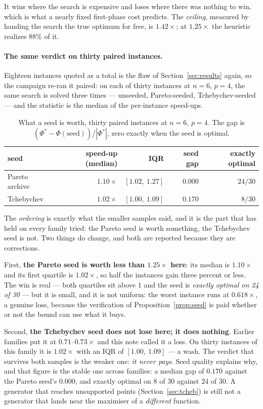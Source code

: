 \documentclass[11pt,a4paper]{article}
\begin{document}
It wins where the search is expensive and loses where there was nothing to win,
which is what a nearly fixed first-phase cost predicts. The \emph{ceiling},
measured by handing the search the true optimum for free, is $1.42\times$; at
$1.25\times$ the heuristic realizes 88\% of it.

\paragraph{The same verdict on thirty paired instances.}  Eighteen instances
quoted as a total is the flaw of Section~\ref{sec:results} again, so the
campaign re-ran it paired: on each of thirty instances at $n=6$, $p=4$, the
same search is solved three times --- unseeded, Pareto-seeded,
Tchebychev-seeded --- and the statistic is the median of the per-instance
speed-ups.

\begin{table}[h]
\centering
\caption{What a seed is worth, thirty paired instances at $n=6$, $p=4$.  The
gap is $(\Phi^{*}-\Phi(\text{seed}))/|\Phi^{*}|$, zero exactly when the seed is
optimal.}
\label{tab:seeds}
\begin{tabular}{lrrrr}
\toprule
seed & speed-up (median) & IQR & seed gap & exactly optimal \\
\midrule
Pareto archive & $1.10\times$ & $[1.02,\ 1.27]$ & $0.000$ & $24/30$ \\
Tchebychev     & $1.02\times$ & $[1.00,\ 1.09]$ & $0.170$ & $8/30$ \\
\bottomrule
\end{tabular}
\end{table}

\noindent
The \emph{ordering} is exactly what the smaller samples said, and it is the
part that has held on every family tried: the Pareto seed is worth something,
the Tchebychev seed is not.  Two things do change, and both are reported
because they are corrections.

First, \textbf{the Pareto seed is worth less than $1.25\times$ here}: its
median is $1.10\times$ and its first quartile is $1.02\times$, so half the
instances gain three percent or less.  The win is real --- both quartiles sit
above $1$ and the seed is \emph{exactly optimal on 24 of 30} --- but it is
small, and it is not uniform: the worst instance runs at $0.618\times$, a
genuine loss, because the verification of Proposition~\ref{prop:seed} is paid
whether or not the bound can use what it buys.

Second, \textbf{the Tchebychev seed does not lose here; it does nothing}.
Earlier families put it at $0.71$--$0.73\times$ and this note called it a loss.
On thirty instances of this family it is $1.02\times$ with an IQR of
$[1.00,\ 1.09]$ --- a wash.  The verdict that survives both samples is the
weaker one: \emph{it never pays}.  Seed quality explains why, and that figure
is the stable one across families: a median gap of $0.170$ against the Pareto
seed's $0.000$, and exactly optimal on $8$ of $30$ against $24$ of $30$.  A
generator that reaches unsupported points (Section~\ref{sec:tcheb}) is still
not a generator that lands near the maximiser of a \emph{different} function.
\end{document}
